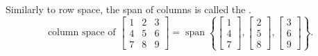 \medskip

Similarly to row space, the span of columns is called the
\emph{}.
\begin{equation*}
\text{column space of }
\begin{bmatrix}
1 & 2 & 3 \\
4 & 5 & 6 \\
7 & 8 & 9
\end{bmatrix}
=
\operatorname{span}
\left\{
\begin{bmatrix}
1 \\ 4 \\ 7
\end{bmatrix}
,
\begin{bmatrix}
2 \\ 5 \\ 8
\end{bmatrix}
,
\begin{bmatrix}
3 \\ 6 \\ 9
\end{bmatrix}
\right\} .
\end{equation*}

